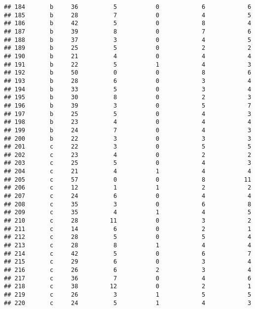 \documentclass[
]{article}
\begin{document}
\begin{verbatim}
## 184       b     36          5           0            6            6
## 185       b     28          7           0            4            5
## 186       b     42          5           0            8            4
## 187       b     39          8           0            7            6
## 188       b     37          3           0            4            5
## 189       b     25          5           0            2            2
## 190       b     21          4           0            4            4
## 191       b     22          5           1            4            3
## 192       b     50          0           0            8            6
## 193       b     28          6           0            3            4
## 194       b     33          5           0            3            4
## 195       b     30          8           0            2            3
## 196       b     39          3           0            5            7
## 197       b     25          5           0            4            3
## 198       b     23          4           0            4            4
## 199       b     24          7           0            4            3
## 200       b     22          3           0            3            3
## 201       c     22          3           0            5            5
## 202       c     23          4           0            2            2
## 203       c     25          5           0            4            3
## 204       c     21          4           1            4            4
## 205       c     57          0           0            8           11
## 206       c     12          1           1            2            2
## 207       c     24          6           0            4            4
## 208       c     35          3           0            6            8
## 209       c     35          4           1            4            5
## 210       c     28         11           0            3            2
## 211       c     14          6           0            2            1
## 212       c     28          5           0            5            4
## 213       c     28          8           1            4            4
## 214       c     42          5           0            6            7
## 215       c     29          6           0            3            4
## 216       c     26          6           2            3            4
## 217       c     36          7           0            4            6
## 218       c     38         12           0            2            1
## 219       c     26          3           1            5            5
## 220       c     24          5           1            4            3

\end{verbatim}
\end{document}
